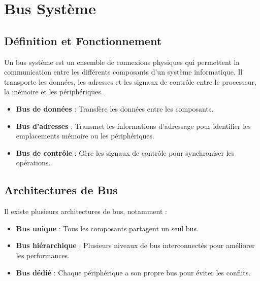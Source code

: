 \documentclass[10pt,a4paper]{article}
\begin{document}
\section*{Bus Système}

\subsection*{Définition et Fonctionnement}

Un bus système est un ensemble de connexions physiques qui permettent la communication entre les différents composants d'un système informatique. Il transporte les données, les adresses et les signaux de contrôle entre le processeur, la mémoire et les périphériques.

\begin{itemize}
    \item \textbf{Bus de données} : Transfère les données entre les composants.
    \item \textbf{Bus d'adresses} : Transmet les informations d'adressage pour identifier les emplacements mémoire ou les périphériques.
    \item \textbf{Bus de contrôle} : Gère les signaux de contrôle pour synchroniser les opérations.
\end{itemize}


\subsection*{Architectures de Bus}

Il existe plusieurs architectures de bus, notamment :
\begin{itemize}
    \item \textbf{Bus unique} : Tous les composants partagent un seul bus.
    \item \textbf{Bus hiérarchique} : Plusieurs niveaux de bus interconnectés pour améliorer les performances.
    \item \textbf{Bus dédié} : Chaque périphérique a son propre bus pour éviter les conflits.
\end{itemize}

\end{document}
